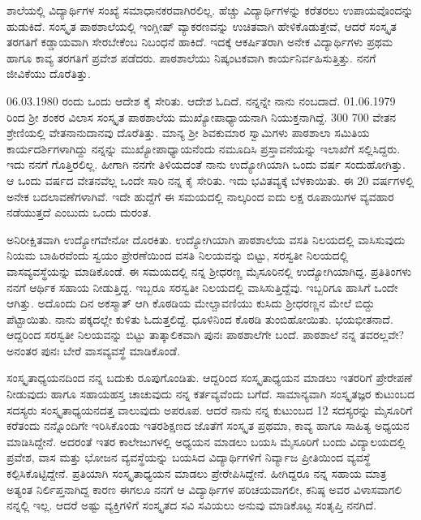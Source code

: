 {ಶಾಲೆಯಲ್ಲಿ ವಿದ್ಯಾರ್ಥಿಗಳ ಸಂಖ್ಯೆ ಸಮಾಧಾನಕರವಾಗಿರಲಿಲ್ಲ.  ಹೆಚ್ಚು ವಿದ್ಯಾರ್ಥಿ\-ಗಳನ್ನು ಕರೆತರಲು ಉಪಾಯವೊಂದನ್ನು ಹುಡುಕಿದೆ.  ಸಂಸ್ಕೃತ ಪಾಠಶಾಲೆಯಲ್ಲಿ ಇಂಗ್ಲೀಷ್ ವ್ಯಾಕರಣವನ್ನು ಉಚಿತವಾಗಿ ಹೇಳಿಕೊಡುತ್ತೇವೆ, ಆದರೆ ಸಂಸ್ಕೃತ ತರ\-ಗತಿಗೆ ಕಡ್ಡಾಯವಾಗಿ ಸೇರಬೇಕೆಂಬ ನಿಬಂಧನೆ ಹಾಕಿದೆ.    ಇದಕ್ಕೆ ಆಕರ್ಷಿತರಾಗಿ ಅನೇಕ ವಿದ್ಯಾರ್ಥಿ\-ಗಳು ಪ್ರಥಮ ಹಾಗೂ ಕಾವ್ಯ ತರಗತಿಗೆ ಪ್ರವೇಶ ಪಡೆದರು.  ಪಾಠಶಾಲೆಯು ನಿಷ್ಕಂಟಕವಾಗಿ ಕಾರ್ಯನಿರ್ವಹಿಸುತ್ತಿತ್ತು.  ನನಗೆ ಜೀವಿಕೆಯು ದೊರೆತಿತ್ತು.  

06.03.1980 ರಂದು ಒಂದು ಆದೇಶ ಕೈ ಸೇರಿತು.  ಆದೇಶ ಓದಿದೆ.  ನನ್ನನ್ನೇ ನಾನು ನಂಬದಾದೆ.  01.06.1979 ರಿಂದ ಶ್ರೀ ಶಂಕರ ವಿಲಾಸ ಸಂಸ್ಕೃತ ಪಾಠಶಾಲೆಯ ಮುಖ್ಯೋಪಾಧ್ಯಾಯನಾಗಿ ನಿಯುಕ್ತನಾಗಿದ್ದೆ.  300  \enginline{-}  700 ವೇತನ ಶ್ರೇಣಿಯಲ್ಲಿ ವೇತನಾನುದಾನವು ದೊರೆತಿತ್ತು.  ಮಾನ್ಯ ಶ್ರೀ ಶಿವಕುಮಾರ ಸ್ವಾಮಿಗಳು ಪಾಠಶಾಲಾ ಸಮಿತಿಯ ಕಾರ್ಯದರ್ಶಿಗಳಾಗಿದ್ದು ನನ್ನನ್ನು ಮುಖ್ಯೋಪಾಧ್ಯಾಯನೆಂದು ನಮೂದಿಸಿ ಪ್ರಸ್ತಾವನೆಯನ್ನು ಇಲಾಖೆಗೆ ಸಲ್ಲಿಸಿದ್ದರು.  ಇದು ನನಗೆ ಗೊತ್ತಿರಲಿಲ್ಲ. ಹೀಗಾಗಿ ನನಗೇ ತಿಳಿಯದಂತೆ ನಾನು ಉದ್ಯೋಗಿಯಾಗಿ ಒಂದು ವರ್ಷ ಸಂದುಹೋಗಿತ್ತು.  ಆ ಒಂದು ವರ್ಷದ ವೇತನವೆಲ್ಲ ಒಂದೇ ಸಾರಿ ನನ್ನ ಕೈ ಸೇರಿತು.  ಇದು ಭವಿತವ್ಯಕ್ಕೆ ಬೆಳಕಾಯಿತು.  ಈ 20 ವರ್ಷಗಳಲ್ಲಿ ಅನೇಕ ಬದಲಾವಣೆಗಳಾಗಿವೆ.  ಇದೇ ಹುದ್ದೆಗೆ ಈ ಸಮಯದಲ್ಲಿ ನಾಲ್ಕರಿಂದ ಐದು ಲಕ್ಷ ರೂಪಾಯಿಗಳ ವ್ಯವಹಾರ ನಡೆಯುತ್ತದೆ ಎಂಬುದು ಒಂದು ದುರಂತ.  

ಅನಿರೀಕ್ಷಿತವಾಗಿ ಉದ್ಯೋಗವೇನೋ ದೊರಕಿತು.  ಉದ್ಯೋಗಿಯಾಗಿ ಪಾಠ\-\break ಶಾಲೆಯ ವಸತಿ ನಿಲಯದಲ್ಲಿ ವಾಸಿಸುವುದು ನಿಯಮ ಬಾಹಿರವೆಂದು ಸ್ವಯಂ ಪ್ರೇರಣೆಯಿಂದ ವಸತಿ ನಿಲಯವನ್ನು ಬಿಟ್ಟು, ಸರಸ್ವತೀ ನಿಲಯದಲ್ಲಿ ವಾಸವ್ಯವಸ್ಥೆಯನ್ನು ಮಾಡಿಕೊಂಡೆ. ಈ ಸಮಯದಲ್ಲಿ ನನ್ನ ಶ್ರೀಧರಣ್ಣ ಮೈಸೂರಿನಲ್ಲಿ ಉದ್ಯೋಗಿಯಾಗಿದ್ದ.  ಪ್ರತಿತಿಂಗಳು ನನಗೆ ಆರ್ಥಿಕ ಸಹಾಯ ನೀಡುತ್ತಿದ್ದ.  ಇಬ್ಬರೂ ಸರಸ್ವತೀ ನಿಲಯದಲ್ಲಿ ವಾಸಿಸುತ್ತಿದ್ದೆವು.  ಇಬ್ಬರಿಗೂ ಹಾಸಿಗೆ ಒಂದೇ ಆಗಿತ್ತು.  ಅದೊಂದು ದಿನ ಅಕಸ್ಮಾತ್ ಆಗಿ ಕೊಠಡಿಯ ಮೇಲ್ಚಾವಣಿಯು ಕುಸಿದು ಶ್ರೀಧರಣ್ಣನ ಮೇಲೆ ಬಿದ್ದು ಪೆಟ್ಟಾಯಿತು. ನಾನು ಪಕ್ಕದಲ್ಲೇ ಕುಳಿತು ಓದುತ್ತಲಿದ್ದೆ.  ಧೂಳಿನಿಂದ ಕೊಠಡಿ ತುಂಬಿಹೋಯಿತು. ಭಯಭೀತನಾದೆ. ಆದ್ದರಿಂದ ಸರಸ್ವತೀ ನಿಲಯವನ್ನು ಬಿಟ್ಟು ತಾತ್ಕಾಲಿಕವಾಗಿ ಪುನಃ ಪಾಠಶಾಲೆಗೇ ಬಂದೆ. ಪಾಠಶಾಲೆ ನನ್ನ ತವರಲ್ಲವೇ? ಅನಂತರ ಪುನಃ ಬೇರೆ ವಾಸವ್ಯವಸ್ಥೆ ಮಾಡಿಕೊಂಡೆ. 

ಸಂಸ್ಕೃತಾಧ್ಯಯನದಿಂದ ನನ್ನ ಬದುಕು ರೂಪುಗೊಂಡಿತು.  ಆದ್ದರಿಂದ ಸಂಸ್ಕೃತಾಧ್ಯಯನ ಮಾಡಲು ಇತರರಿಗೆ ಪ್ರೇರೇಪಣೆ ನೀಡುವುದು ಹಾಗೂ ಸಹಾಯಹಸ್ತ ಚಾಚುವುದು ನನ್ನ ಕರ್ತವ್ಯವೆಂದು ಬಗೆದೆ.  ಸಾಮಾನ್ಯವಾಗಿ  ಸಂಸ್ಕೃತಜ್ಞರ ಕುಟುಂಬದ ಸದಸ್ಯರು ಸಂಸ್ಕೃತಾಧ್ಯಯನದತ್ತ ವಾಲುವುದು ಅಪರೂಪ.  ಆದರೆ ನಾನು ನನ್ನ ಕುಟುಂಬದ 12 ಸದಸ್ಯರನ್ನು ಮೈಸೂರಿಗೆ ಕರೆತಂದು ನನ್ನೊಂದಿಗೇ ಇರಿಸಿಕೊಂಡು ಇತರ\break ಶಿಕ್ಷಣದ ಜೊತೆಗೆ ಸಂಸ್ಕೃತ ಪ್ರಥಮಾ, ಕಾವ್ಯ ಹಾಗೂ ಸಾಹಿತ್ಯ ಅಧ್ಯಯನ ಮಾಡಿಸಿದ್ದೇನೆ.  ಅದರಂತೆ ಇತರ ಕಾಲೇಜುಗಳಲ್ಲಿ ಅಧ್ಯಯನ ಮಾಡಲು ಬಯಸಿ ಮೈಸೂರಿಗೆ ಬಂದು ವಿದ್ಯಾಲಯದಲ್ಲಿ ಪ್ರವೇಶ, ವಾಸ ಮತ್ತು ಭೋಜನ ವ್ಯವಸ್ಥೆಯನ್ನು ಬಯಸಿದ ವಿದ್ಯಾರ್ಥಿಗಳಿಗೆ ನಿರ್ವ್ಯಾಜ ಪ್ರೀತಿಯಿಂದ ವ್ಯವಸ್ಥೆ ಕಲ್ಪಿಸಿಕೊಟ್ಟಿದ್ದೇನೆ.  ಪ್ರತಿಯಾಗಿ ಸಂಸ್ಕೃತಾಧ್ಯಯನ ಮಾಡಲು ಪ್ರೇರೇಪಿಸಿದ್ದೇನೆ.  ಹೀಗಿದ್ದರೂ ನನ್ನ ಸಹಾಯ ಮಾತ್ರ ಅತ್ಯಂತ ನಿರ್ಲಿಪ್ತನಾಗಿದ್ದ ಕಾರಣ ಈಗಲೂ ನನಗೆ ಆ ವಿದ್ಯಾರ್ಥಿಗಳ ಪರಿಚಯ\-ವಾಗಲೀ, ಕನಿಷ್ಠ ಅವರ ವಿಳಾಸ\-ವಾಗಲಿ ನನ್ನಲ್ಲಿ ಇಲ್ಲ.  ಆದರೆ ಅಷ್ಟು ವ್ಯಕ್ತಿಗಳಿಗೆ ಸಂಸ್ಕೃತದ ಸವಿ ಸವಿಯಲು ಅನುವು ಮಾಡಿಕೊಟ್ಟ ಸಂತೃಪ್ತಿ ನನಗಿದೆ.  

}
